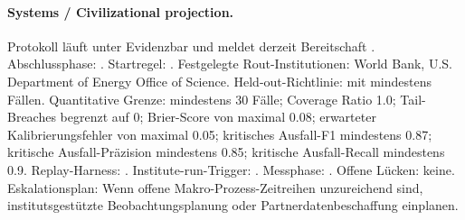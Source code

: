 \paragraph{Systems / Civilizational projection.}
Protokoll  läuft unter Evidenzbar  und meldet derzeit Bereitschaft .
Abschlussphase: . Startregel: .
Festgelegte Rout-Institutionen: World Bank, \allowbreak U.S. Department of Energy Office of Science.
Held-out-Richtlinie:  mit mindestens  Fällen.
Quantitative Grenze: mindestens 30 Fälle; Coverage Ratio 1.0; Tail-Breaches begrenzt auf 0; Brier-Score von maximal 0.08; erwarteter Kalibrierungsfehler von maximal 0.05; kritisches Ausfall-F1 mindestens 0.87; kritische Ausfall-Präzision mindestens 0.85; kritische Ausfall-Recall mindestens 0.9.
Replay-Harness: .
Institute-run-Trigger: . Messphase: .
Offene Lücken: keine.
Eskalationsplan: Wenn offene Makro-Prozess-Zeitreihen unzureichend sind, institutsgestützte Beobachtungsplanung oder Partnerdatenbeschaffung einplanen.

